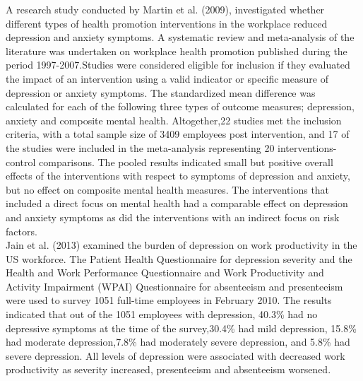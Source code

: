 \documentclass[12pt]{article}
\numberwithin{equation}{section}
\begin{document}
\noindent A research study conducted by Martin et al. (2009), investigated whether different types of health promotion interventions in the workplace reduced depression and anxiety symptoms. A systematic review and meta-analysis of the literature was undertaken on workplace health promotion published during the period 1997-2007.Studies were considered eligible for inclusion if they evaluated the impact of an intervention using a valid indicator or specific measure of depression or anxiety symptoms. The standardized mean difference was calculated for each of the following three types of outcome measures; depression, anxiety and composite mental health. Altogether,22 studies met the inclusion criteria, with a total sample size of 3409 employees post intervention, and 17 of the studies were included in the meta-analysis representing 20 interventions-control comparisons. The pooled results indicated small but positive overall effects of the interventions with respect to symptoms of depression and anxiety, but no effect on composite mental health measures. The interventions that included a direct focus on mental health had a comparable effect on depression and anxiety symptoms as did the interventions with an indirect focus on risk factors.\\

\noindent Jain et al. (2013) examined the burden of depression on work productivity in the US workforce. The Patient Health Questionnaire for depression severity and the Health and Work Performance Questionnaire and Work Productivity and Activity Impairment (WPAI) Questionnaire for absenteeism and presenteeism were used to survey 1051 full-time employees in February 2010. The results indicated that out of the 1051 employees with depression, 40.3\% had no depressive symptoms at the time of the survey,30.4\% had mild depression, 15.8\% had moderate depression,7.8\% had moderately severe depression, and 5.8\% had severe depression. All levels of depression were associated with decreased work productivity as severity increased, presenteeism and absenteeism worsened.\\
\end{document}
